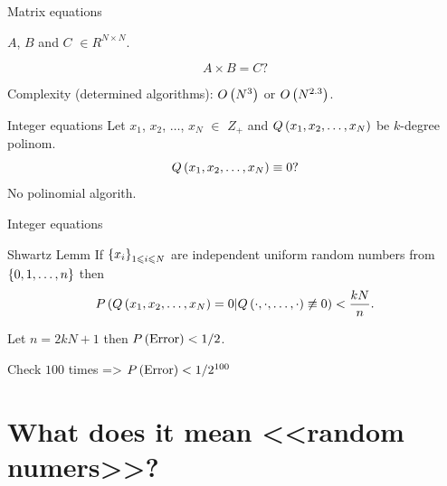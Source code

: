 \documentclass[12pt]{beamer}
\begin{document}
\begin{frame}{Matrix equations}
{
\small
 $A$, $B$ and $C$ $\in R^{N\times N}$.
 
 \begin{equation}
A\times B = C ?
\label{matrices}
 \end{equation}

Complexity (determined algorithms): $O\left(N^3\right)$ or $O\left(N^{2.3}\right)$.
 

}
\end{frame}

\begin{frame}{Integer equations}
Let $x_1$, $x_2$, $\ldots$, $x_N$ $\in$ $Z_+$ and $Q\left(x_1,x_2,\ldots, x_N\right)$ be $k$-degree polinom.
 \begin{equation}
 Q\left(x_1,x_2,\ldots, x_N\right) \equiv 0 ?
  \label{equ}
 \end{equation}
 No polinomial algorith.

\end{frame}

\begin{frame}{Integer equations}
 
 \begin{block}{Shwartz Lemm}
  If $\left\{x_i\right\}_{1\leqslant i \leqslant N}$ are independent uniform random numbers from $\left\{0, 1, \ldots, n\right\}$
  then $$P\left(Q\left(x_1,x_2,\ldots, x_N\right) = 0 | Q\left(\cdot,\cdot,\ldots, \cdot\right) \not\equiv 0\right) < \frac{k N}{n}.$$
 \end{block}
 Let $n = 2 k N + 1$ then $P\left(\text{Error}\right) <1/2$.
 
 Check $100$ times => $P\left(\text{Error}\right) < {1/2^{100}}$
\end{frame}

\section{What does it mean <<random numers>>?}
\end{document}
